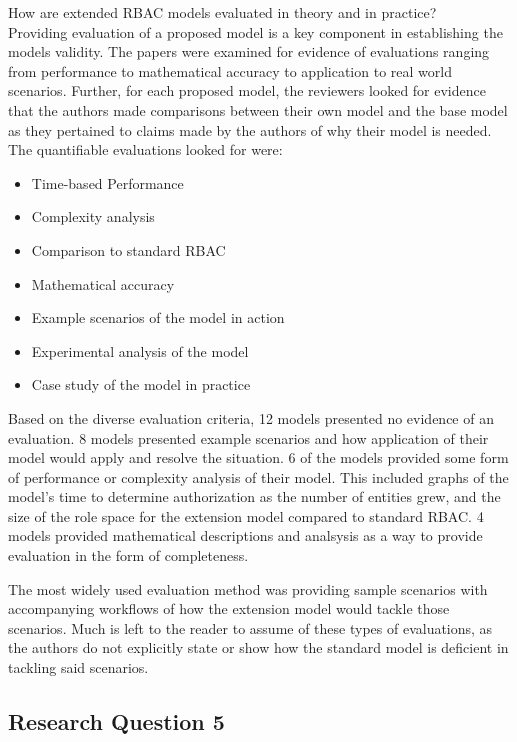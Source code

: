 How are extended RBAC models evaluated in theory and in practice? \\

Providing evaluation of a proposed model is a key component in establishing the models validity.  The papers were examined
for evidence of evaluations ranging from performance to mathematical accuracy to application to real world scenarios.  Further,
for each proposed model, the reviewers looked for evidence that the authors made comparisons between their own model and the base
model as they pertained to claims made by the authors of why their model is needed.  The quantifiable evaluations looked for were:

\begin{itemize}
\item Time-based Performance
\item Complexity analysis
\item Comparison to standard RBAC
\item Mathematical accuracy
\item Example scenarios of the model in action
\item Experimental analysis of the model
\item Case study of the model in practice
\end{itemize}

Based on the diverse evaluation criteria, 12 models presented no evidence of an evaluation.  8 models presented example scenarios
and how application of their model would apply and resolve the situation.  6 of the models provided some form of performance
or complexity analysis of their model.  This included graphs of the model's time to determine authorization as the number of entities
grew, and the size of the role space for the extension model compared to standard RBAC. 4 models provided mathematical descriptions
and analsysis as a way to provide evaluation in the form of completeness.

The most widely used evaluation method was providing sample scenarios with accompanying workflows of how the extension model
would tackle those scenarios.  Much is left to the reader to assume of these types of evaluations, as the authors do not explicitly state
or show how the standard model is deficient in tackling said scenarios.

\subsection{Research Question 5}

